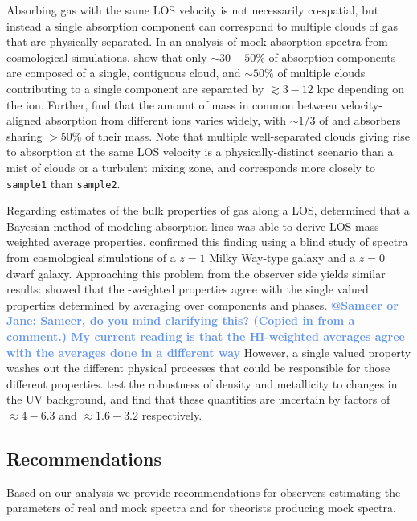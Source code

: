 \documentclass[fleqn,usenatbib]{mnras}
\makeatletter
\newcommand{\atsameer}[1]{\textcolor{CornflowerBlue}{\textbf{@Sameer or Jane: #1}}}
\makeatother
\begin{document}
Absorbing gas with the same LOS velocity is not necessarily co-spatial, but instead a single absorption component can correspond to multiple clouds of gas that are physically separated.
In an analysis of mock absorption spectra from cosmological simulations, \cite{Marra2022} show that only $\sim 30-50\%$ of absorption components are composed of a single, contiguous cloud, and $\sim 50\%$ of multiple clouds contributing to a single component are separated by $\gtrsim 3-12$ kpc depending on the ion.
Further, \cite{Marra2022} find that the amount of mass in common between velocity-aligned absorption from different ions varies widely, with $\sim 1/3$ of  and  absorbers sharing $>50\%$ of their mass.
Note that multiple well-separated clouds giving rise to absorption at the same LOS velocity is a physically-distinct scenario than a mist of clouds or a turbulent mixing zone, and corresponds more closely to \texttt{sample1} than \texttt{sample2}.

Regarding estimates of the bulk properties of gas along a LOS,
\cite{Liang2018} determined that a Bayesian method of modeling absorption lines was able to derive LOS  mass-weighted average properties.
\cite{marra2021.cosmo.sims.test.observational.modeling} confirmed this finding using a blind study of spectra from cosmological simulations of a $z=1$ Milky Way-type galaxy and a $z=0$ dwarf galaxy.
Approaching this problem from the observer side yields similar results:
\cite{Sameer2021} showed that the -weighted properties agree with the single valued properties determined by averaging over components and phases.
\atsameer{Sameer, do you mind clarifying this? (Copied in from a comment.) My current reading is that the HI-weighted averages agree with the averages done in a different way}
However, a single valued property washes out the different physical processes that could be responsible for those different properties.
\cite{Acharya2021} test the robustness of density and metallicity to changes in the UV background, and find that these quantities are uncertain by factors of $\approx 4-6.3$ and $\approx 1.6-3.2$ respectively.

\subsection{Recommendations}

Based on our analysis we provide recommendations for observers estimating the parameters of real and mock spectra and for theorists producing mock spectra.
\end{document}
